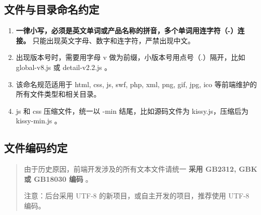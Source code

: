 \documentclass[letterpaper,10pt,english]{sphinxmanual}
\begin{document}
\subsection{文件与目录命名约定}
\label{styleguide/common-conventions:id2}\begin{enumerate}
\item {}
\textbf{一律小写，必须是英文单词或产品名称的拼音，多个单词用连字符（-）连接。} 只能出现英文字母、数字和连字符，严禁出现中文。

\item {}
出现版本号时，需要用字母 v 做为前缀，小版本号用点号（.）隔开，比如 global-v8.js 或 detail-v2.2.js 。

\item {}
该命名规范适用于 html, css, js, swf, php, xml, png, gif, jpg, ico 等前端维护的所有文件类型和相关目录。

\item {}
js 和 css 压缩文件，统一以 -min 结尾，比如源码文件为 kissy.js，压缩后为 kissy-min.js 。

\end{enumerate}


\subsection{文件编码约定}
\label{styleguide/common-conventions:id3}\begin{quote}

由于历史原因，前端开发涉及的所有文本文件请统一 \textbf{采用 GB2312, GBK 或 GB18030 编码} 。

注意：后台采用 UTF-8 的新项目，或自主开发的项目，推荐使用 UTF-8 编码。
\end{quote}
\end{document}
